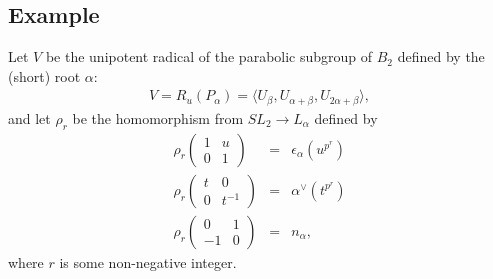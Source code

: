 \subsection{Example}
Let $V$ be the unipotent radical of the parabolic subgroup of $B_2$ defined by the (short) root $\alpha$:
\begin{eqnarray*}
V=R_u(P_\alpha)=\langle U_\beta, U_{\alpha + \beta}, U_{2\alpha + \beta} \rangle,
\end{eqnarray*}
and let $\rho_r$ be the homomorphism from $SL_2 \rightarrow L_\alpha$ defined by
\begin{eqnarray*}
\rho_r\left(\begin{matrix} 1 & u \\ 0 & 1\end{matrix}\right) &=& \epsilon_\alpha(u^{p^r}) \\
\rho_r\left(\begin{matrix} t & 0 \\ 0 & t^{-1}\end{matrix}\right) &=& \alpha ^\vee(t^{p^r}) \\
\rho_r\left(\begin{matrix} 0 & 1 \\ -1 & 0\end{matrix}\right) &=& n_ \alpha,
\end{eqnarray*}
where $r$ is some non-negative integer.

